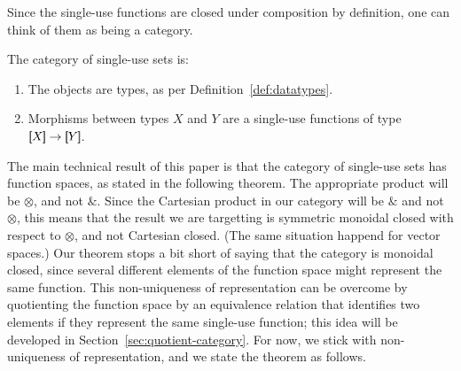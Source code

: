 
Since the single-use functions are closed under composition by definition, one can think of them as being a category. 


\begin{definition}\label{def:single-use-category}
    The category of single-use sets is:
    \begin{enumerate}
        \item The objects are types, as per Definition~\ref{def:datatypes}.
        \item Morphisms between types $X$ and $Y$ are a single-use functions of type $\sem X \to \sem Y$.
    \end{enumerate}
\end{definition}




 
The main technical result of this paper is that the category of single-use sets has function spaces, as stated in the following theorem.  The appropriate product will be $\otimes$, and not $\&$. Since the Cartesian product in our category will be $\&$ and not $\otimes$, this means that the result we are targetting is symmetric monoidal closed with respect to $\otimes$, and not Cartesian closed. (The same situation happend for vector spaces.)  Our theorem stops a bit short of saying that the category is monoidal closed, since several different elements of the function space might represent the same function. This non-uniqueness of representation can be overcome  by quotienting the function space  by an equivalence relation that identifies two elements if they represent the same single-use function; this idea will be developed  in Section~\ref{sec:quotient-category}. For now, we stick with non-uniqueness of representation, and we state the theorem as follows.

